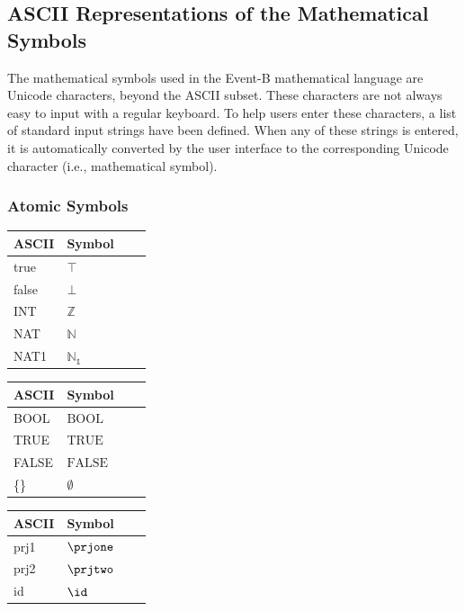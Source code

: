 \subsection{ASCII Representations of the Mathematical Symbols}
\label{ascii_representations_of_the_mathematical_symbols}


The mathematical symbols used in the Event-B mathematical language are Unicode characters, beyond the ASCII subset. These characters are not always easy to input with a regular keyboard. To help users enter these characters, a list of standard input strings have been defined. When any of these strings is entered, it is automatically converted by the user interface to the corresponding Unicode character (i.e., mathematical symbol).

\subsubsection{Atomic Symbols}

\begin{center}
    \begin{tabular}{ | l | l | l | p{5cm} |}
    \hline
	ASCII & Symbol \\ \hline
	true & $\top$ \\ \hline
	false & $\bot$ \\ \hline
	INT & $\mathbb{Z}$ \\ \hline
	NAT & $\mathbb{N}$ \\ \hline
	NAT1 & $\mathbb{N_1}$ \\ \hline
    \end{tabular}
    \begin{tabular}{ | l | l | l | p{5cm} |}
    \hline
	ASCII & Symbol \\ \hline
	BOOL & $\mathrm{BOOL}$ \\ \hline
	TRUE & $\mathrm{TRUE}$ \\ \hline
	FALSE & $\mathrm{FALSE}$ \\ \hline
	\{\} & $\emptyset$ \\ \hline
    \end{tabular}
    \begin{tabular}{ | l | l | l | p{5cm} |}
    \hline
	ASCII & Symbol \\ \hline
	prj1 & $\prjone$ \\ \hline
	prj2 & $\prjtwo$ \\ \hline
	id & $\id$ \\ \hline
    \end{tabular}
\end{center}

